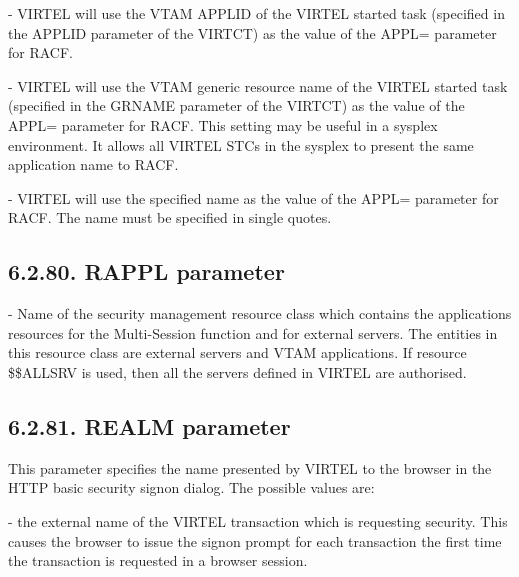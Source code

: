 \documentclass[letterpaper,10pt,english]{sphinxmanual}
\begin{document}
 - VIRTEL will use the VTAM APPLID of the VIRTEL started task (specified in the APPLID parameter of the VIRTCT) as the value of the APPL= parameter for RACF.

 - VIRTEL will use the VTAM generic resource name of the VIRTEL started task (specified in the GRNAME parameter of the VIRTCT) as the value of the APPL= parameter for RACF. This setting may be useful in a sysplex environment. It allows all VIRTEL STCs in the sysplex to present the same application name to RACF.

 - VIRTEL will use the specified name as the value of the APPL= parameter for RACF. The name must be specified in single quotes.


\subsection{6.2.80. RAPPL parameter}
\label{\detokenize{Installation_Guide:rappl-parameter}}
\begin{sphinxVerbatim}[commandchars=\\\{\}]
 
\end{sphinxVerbatim}

 - Name of the security management resource class which contains the applications resources for the Multi-Session function and for external servers. The entities in this resource class are external servers and VTAM applications. If resource \$\$ALLSRV is used, then all the servers defined in VIRTEL are authorised.


\subsection{6.2.81. REALM parameter}
\label{\detokenize{Installation_Guide:realm-parameter}}
\begin{sphinxVerbatim}[commandchars=\\\{\}]
 
\end{sphinxVerbatim}

This parameter specifies the name presented by VIRTEL to the browser in the HTTP basic security signon dialog. The possible values are:

 - the external name of the VIRTEL transaction which is requesting security. This causes the browser to issue the signon prompt for each transaction the first time the transaction is requested in a browser session.
\end{document}

